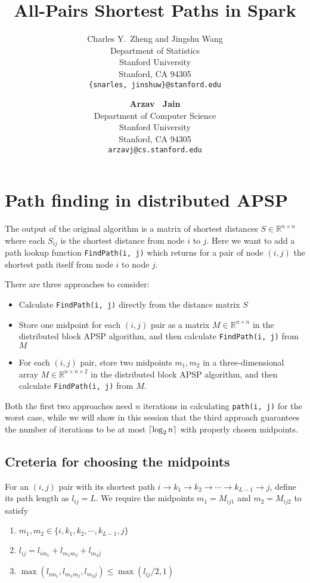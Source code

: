 \documentclass{article} %
\title{All-Pairs Shortest Paths in Spark}
\author{
Charles Y.~Zheng and Jingshu Wang\\
Department of Statistics\\
Stanford University\\
Stanford, CA 94305 \\
\texttt{\{snarles, jinshuw\}@stanford.edu} \\
\and
\textbf{Arzav ~Jain} \\
Department of Computer Science\\
Stanford University\\
Stanford, CA 94305 \\
\texttt{arzavj@cs.stanford.edu} \\
}
\DeclarePairedDelimiter\ceil{\lceil}{\rceil}
\newcommand{\real}{\mathbb{R}}
\begin{document}
\maketitle

\section{Path finding in distributed APSP}

The output of the original algorithm is a matrix of shortest distances $S \in \real^{n \times n}$ where 
each $S_{ij}$ is the shortest distance from node $i$ to $j$. Here we want to add a path lookup function {\tt FindPath(i, j)} which returns for a pair of node $(i, j)$ the shortest path itself from node $i$ to node $j$. 

There are three approaches to consider:
\begin{itemize}
\item Calculate {\tt FindPath(i, j)} directly from the distance matrix $S$
\item Store one midpoint for each $(i, j)$ pair as a matrix $M \in \real^{n \times n}$ in the distributed block APSP algorithm, and then calculate {\tt FindPath(i, j)} from $M$
\item For each $(i, j)$ pair, store two midpoints $m_1, m_2$ in a three-dimensional array $M \in \real^{n \times n \times 2}$ in the distributed block APSP algorithm, and then calculate {\tt FindPath(i, j)} from $M$.
\end{itemize}

Both the first two approaches need $n$ iterations in calculating {\tt path(i, j)} for the worst case, while we will show in this session that the third approach guarantees the number of iterations to be at most $\ceil{\log_2 n}$ with properly chosen midpoints. 


\subsection{Creteria for choosing the midpoints}
For an $(i, j)$ pair with its shortest path $i \to k_1 \to k_2 \to \cdots \to k_{L - 1} \to j$, define its path length as $l_{ij} = L$. We require the midpoints $m_1 = M_{ij1}$ and $m_2 = M_{ij2}$ to satisfy
\begin{enumerate}
\item $m_1, m_2 \in \{i, k_1, k_2, \cdots, k_{L-1}, j\}$
\item $l_{ij} = l_{im_1} + l_{m_1m_2} + l_{m_2j}$
\item $\max(l_{im_1}, l_{m_1m_2}, l_{m_2j}) \leq \max(l_{ij}/2, 1)$
\end{enumerate}
\end{document}
